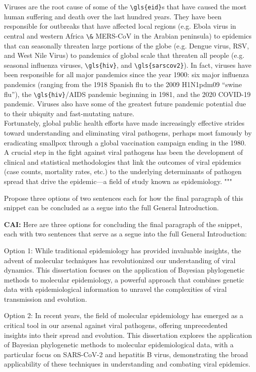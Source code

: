     Viruses are the root cause of some of the \verb|\gls{eid}|s that have caused the most human suffering and death over the last hundred years.
    They have been responsible for outbreaks that have affected local regions (e.g. Ebola virus in central and western Africa \verb|\&| MERS-CoV in the Arabian peninsula) to epidemics that can seasonally threaten large portions of the globe (e.g. Dengue virus, RSV, and West Nile Virus) to pandemics of global scale that threaten all people (e.g. seasonal influenza viruses, \verb|\gls{hiv}|, and \verb|\gls{sarscov2}|).
    In fact, viruses have been responsible for all major pandemics since the year 1900: six major influenza pandemics (ranging from the 1918 Spanish flu to the 2009 H1N1pdm09 ``swine flu''), the \verb|\gls{hiv}|/AIDS pandemic beginning in 1981, and the 2020 COVID-19 pandemic.
    Viruses also have some of the greatest future pandemic potential due to their ubiquity and fast-mutating nature.\\
    
    Fortunately, global public health efforts have made increasingly effective strides toward understanding and eliminating viral pathogens, perhaps most famously by eradicating smallpox through a global vaccination campaign ending in the 1980.
    A crucial step in the fight against viral pathogens has been the development of clinical and statistical methodologies that link the outcomes of viral epidemics (case counts, mortality rates, etc.) to the underlying determinants of pathogen spread that drive the epidemic---a field of study known as epidemiology.
    """
    
    Propose three options of two sentences each for how the final paragraph of this snippet can be concluded as a segue into the full General Introduction.

\textbf{CAI:} Here are three options for concluding the final paragraph of the snippet, each with two sentences that serve as a segue into the full General Introduction:

    Option 1:
    While traditional epidemiology has provided invaluable insights, the advent of molecular techniques has revolutionized our understanding of viral dynamics. This dissertation focuses on the application of Bayesian phylogenetic methods to molecular epidemiology, a powerful approach that combines genetic data with epidemiological information to unravel the complexities of viral transmission and evolution.
    
    Option 2:
    In recent years, the field of molecular epidemiology has emerged as a critical tool in our arsenal against viral pathogens, offering unprecedented insights into their spread and evolution. This dissertation explores the application of Bayesian phylogenetic methods to molecular epidemiological data, with a particular focus on SARS-CoV-2 and hepatitis B virus, demonstrating the broad applicability of these techniques in understanding and combating viral epidemics.
    
